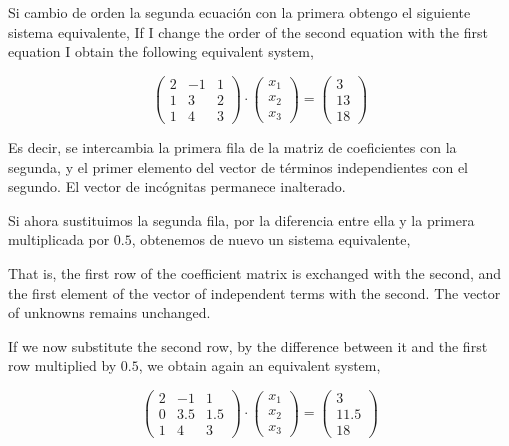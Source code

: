 \begin{paracol}{2}
Si cambio de orden la segunda ecuación con la primera obtengo el siguiente sistema equivalente,
\switchcolumn
If I change the order of the second equation with the first equation I obtain the following equivalent system,
\end{paracol}

\begin{equation*}
\begin{pmatrix}
2& -1& 1\\
1& 3& 2\\
1& 4& 3
\end{pmatrix}\cdot \begin{pmatrix}
x_1\\
x_2\\
x_3
\end{pmatrix}=\begin{pmatrix}
3\\
13\\
18
\end{pmatrix}
\end{equation*}

\begin{paracol}{2}
Es decir, se intercambia la primera fila de la matriz de coeficientes con la segunda, y el primer elemento del vector de términos independientes con el segundo. El vector de incógnitas permanece inalterado. 

Si ahora sustituimos la segunda fila, por la diferencia entre ella y la primera multiplicada por $0.5$, obtenemos de nuevo un sistema equivalente, 

    \switchcolumn
That is, the first row of the coefficient matrix is exchanged with the second, and the first element of the vector of independent terms with the second. The vector of unknowns remains unchanged. 

If we now substitute the second row, by the difference between it and the first row multiplied by $0.5$, we obtain again an equivalent system, 
\end{paracol}


\begin{equation*}
\begin{pmatrix}
2& -1& 1\\
0& 3.5& 1.5\\
1& 4& 3
\end{pmatrix}\cdot \begin{pmatrix}
x_1\\
x_2\\
x_3
\end{pmatrix}=\begin{pmatrix}
3\\
11.5\\
18
\end{pmatrix}
\end{equation*}

